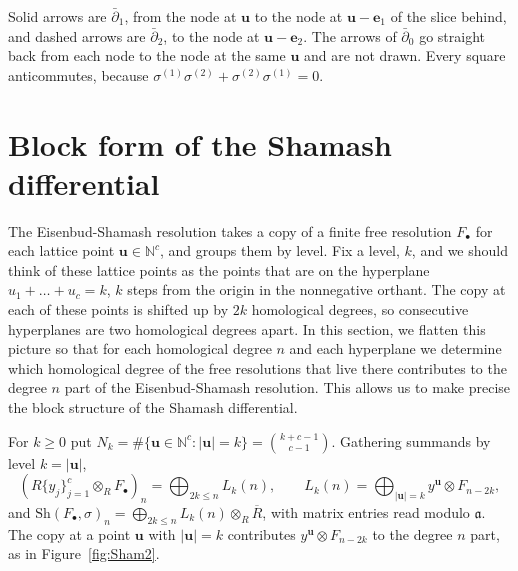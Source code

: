 \documentclass[12pt]{amsart}
\theoremstyle{plain}
\theoremstyle{definition}
\newcommand{\F}{ {F_\bullet} }
\newcommand{\Rbar}{\overline{R}}
\newcommand{\aaa}{\mathfrak{a}}
\newcommand{\N}{\mathbb{N}}
\newcommand{\Sh}{\mathrm{Sh}}
\begin{document}
Solid arrows are $\bar\partial_1$, from the node at $\boldsymbol{u}$ to the node at $\boldsymbol{u} - \boldsymbol{e}_1$ of the slice behind, and dashed arrows are $\bar\partial_2$, to the node at $\boldsymbol{u} - \boldsymbol{e}_2$. The arrows of $\bar\partial_0$ go straight back from each node to the node at the same $\boldsymbol{u}$ and are not drawn. Every square anticommutes, because $\sigma^{(1)}\sigma^{(2)} + \sigma^{(2)}\sigma^{(1)} = 0$.

\section{Block form of the Shamash differential}\label{sec:block}

The Eisenbud-Shamash resolution takes a copy of a finite free resolution $\F$ for each lattice point $\boldsymbol{u} \in \N^c$, and groups them by level. Fix a level, $k$, and we should think of these lattice points as the points that are on the hyperplane $u_1 + \dots + u_c = k$, $k$ steps from the origin in the nonnegative orthant. The copy at each of these points is shifted up by $2k$ homological degrees, so consecutive hyperplanes are two homological degrees apart. In this section, we flatten this picture so that for each homological degree $n$ and each hyperplane we determine which homological degree of the free resolutions that live there contributes to the degree $n$ part of the Eisenbud-Shamash resolution. This allows us to make precise the block structure of the Shamash differential.

For $k \ge 0$ put $N_k = \#\{\boldsymbol{u} \in \N^c : |\boldsymbol{u}| = k\} = \binom{k+c-1}{c-1}$. Gathering summands by level $k = |\boldsymbol{u}|$,
\[
    (R\{y_j\}_{j=1}^{c} \otimes_R \F)_n = \bigoplus_{2k \le n} L_k(n), \qquad L_k(n) = \bigoplus_{|\boldsymbol{u}| = k} y^{\boldsymbol{u}} \otimes F_{n-2k} ,
\]
and $\Sh(\F, \sigma)_n = \bigoplus_{2k \le n} L_k(n) \otimes_R \Rbar$, with matrix entries read modulo $\aaa$. The copy at a point $\boldsymbol{u}$ with $|\boldsymbol{u}| = k$ contributes $y^{\boldsymbol{u}} \otimes F_{n-2k}$ to the degree $n$ part, as in Figure~\ref{fig:Sham2}.
\end{document}
